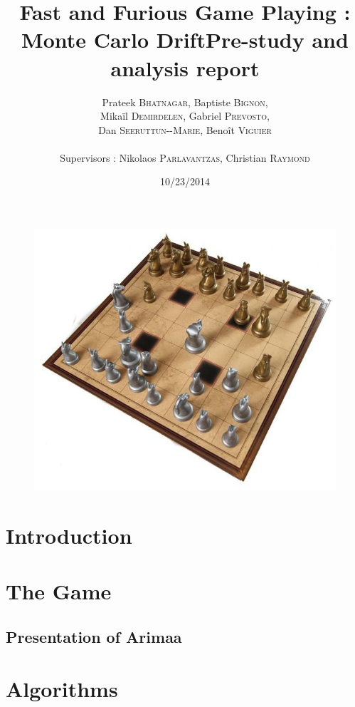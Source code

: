 \documentclass[12pt]{article}
\title{Fast and Furious Game Playing : Monte Carlo Drift\smallbreak Pre-study and analysis report}
\author{Prateek \textsc{Bhatnagar}, Baptiste \textsc{Bignon}, \\
        Mikaïl \textsc{Demirdelen}, Gabriel \textsc{Prevosto}, \\
        Dan \textsc{Seeruttun-{}-Marie}, Benoît \textsc{Viguier} \\
        \\
        Supervisors : Nikolaos \textsc{Parlavantzas}, Christian \textsc{Raymond}}
\date{10/23/2014}
\begin{document}
\maketitle

\begin{figure}[!h] 
\centerline{\includegraphics[scale=0.50]{img/arimaa}}
\end{figure}
\newpage
\begin{abstract}

\end{abstract}



\newpage
\tableofcontents
\newpage


\section{Introduction}
\newpage
\section{The Game}
\subsection{Presentation of Arimaa} 
\newpage
\section{Algorithms}
\newpage

\end{document}
